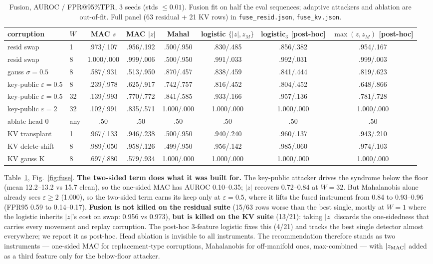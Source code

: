 \documentclass[10pt,twocolumn]{article}
\begin{document}
\begin{table}[t]\centering\small
\begin{tabular}{llcccccc}
\toprule
corruption & $W$ & MAC $s$ & MAC $|z|$ & Mahal & logistic $\{|z|,z_M\}$ & logistic$_3$ [post-hoc] & $\max(z,z_M)$ [post-hoc]\\
\midrule
resid swap & 1 & .973/.107 & .956/.192 & .500/.950 & .830/.485 & .856/.382 & .954/.167\\
resid swap & 8 & 1.000/.000 & .999/.006 & .500/.950 & .991/.033 & .992/.031 & .999/.003\\
gauss $\sigma{=}0.5$ & 8 & .587/.931 & .513/.950 & .870/.457 & .838/.459 & .841/.444 & .819/.623\\
key-public $\varepsilon{=}0.5$ & 8 & .239/.978 & .625/.917 & .742/.757 & .816/.452 & .804/.452 & .648/.866\\
key-public $\varepsilon{=}0.5$ & 32 & .139/.993 & .770/.772 & .841/.585 & .933/.166 & .957/.136 & .781/.728\\
key-public $\varepsilon{=}2$ & 32 & .102/.991 & .835/.571 & 1.000/.000 & 1.000/.000 & 1.000/.000 & 1.000/.000\\
ablate head 0 & any & .50 & .50 & .50 & .50 & .50 & .50\\
\midrule
KV transplant & 1 & .967/.133 & .946/.238 & .500/.950 & .940/.240 & .960/.137 & .943/.210\\
KV delete-shift & 8 & .989/.050 & .958/.126 & .499/.950 & .956/.142 & .985/.060 & .974/.103\\
KV gauss K & 8 & .697/.880 & .579/.934 & 1.000/.000 & 1.000/.000 & 1.000/.000 & 1.000/.000\\
\bottomrule
\end{tabular}
\caption{Fusion, AUROC / FPR@95\%TPR, 3 seeds (stds $\le 0.01$). Fusion fit on half the eval
sequences; adaptive attackers and ablation are out-of-fit. Full panel (63 residual + 21 KV rows)
in \texttt{fuse\_resid.json}, \texttt{fuse\_kv.json}.}\label{tab:fuse}
\end{table}

Table~\ref{tab:fuse}, Fig.~\ref{fig:fuse}. \textbf{The two-sided term does what it was built
for.} The key-public attacker drives the syndrome below the floor (mean 12.2--13.2 vs 15.7
clean), so the one-sided MAC has AUROC 0.10--0.35; $|z|$ recovers 0.72--0.84 at $W{=}32$. But
Mahalanobis alone already sees $\varepsilon\ge2$ (1.000), so the two-sided term earns its keep
only at $\varepsilon{=}0.5$, where it lifts the fused instrument from 0.84 to 0.93--0.96
(FPR95 0.59 to 0.14--0.17). \textbf{Fusion is not killed on the residual suite} (15/63 rows
worse than the best single, mostly at $W{=}1$ where the logistic inherits $|z|$'s cost on
swap: 0.956 vs 0.973), \textbf{but is killed on the KV suite} (13/21): taking $|z|$ discards
the one-sidedness that carries every movement and replay corruption. The post-hoc 3-feature
logistic fixes this (4/21) and tracks the best single detector almost everywhere; we report it
as post-hoc. Head ablation is invisible to all instruments. The recommendation
therefore stands as two instruments --- one-sided MAC for replacement-type corruptions,
Mahalanobis for off-manifold ones, max-combined ---
with $|z_{\rm MAC}|$ added as a third feature only for the below-floor attacker.
\end{document}
